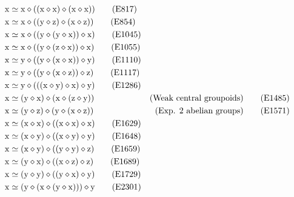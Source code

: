 \begin{align}
    \x &\formaleq \x \op ((\x \op \x) \op (\x \op \x)) \label{eq817}\tag{E817} \\
    \x &\formaleq \x \op ((\y \op \z) \op (\x \op \z)) \label{eq854}\tag{E854}\\
    \x &\formaleq \x \op ((\y \op (\y \op \x)) \op \x) \label{eq1045}\tag{E1045} \\
    \x &\formaleq \x \op ((\y \op (\z \op \x)) \op \x) \label{eq1055}\tag{E1055} \\
    \x &\formaleq \y \op ((\y \op (\x \op \x)) \op \y) \label{eq1110}\tag{E1110} \\
    \x &\formaleq \y \op ((\y \op (\x \op \z)) \op \z) \label{eq1117}\tag{E1117} \\
    \x &\formaleq \y \op (((\x \op \y) \op \x) \op \y) \label{eq1286}\tag{E1286} \\
    \x &\formaleq (\y \op \x) \op (\x \op (\z \op \y)) & \hbox{(Weak central groupoids)}\label{eq1485}\tag{E1485} \\
    \x &\formaleq (\y \op \z) \op (\y \op (\x \op \z)) & \hbox{(Exp. $2$ abelian groups)} \label{eq1571}\tag{E1571} \\
    \x &\formaleq (\x \op \x) \op ((\x \op \x) \op \x) \label{eq1629}\tag{E1629} \\
    \x &\formaleq (\x \op \y) \op ((\x \op \y) \op \y) \label{eq1648}\tag{E1648} \\
    \x &\formaleq (\x \op \y) \op ((\y \op \y) \op \z) \label{eq1659}\tag{E1659} \\
    \x &\formaleq (\y \op \x) \op ((\x \op \z) \op \z) \label{eq1689}\tag{E1689} \\
    \x &\formaleq (\y \op \y) \op ((\y \op \x) \op \y) \label{eq1729}\tag{E1729} \\
    \x &\formaleq (\y \op (\x \op (\y \op \x))) \op \y \label{eq2301}\tag{E2301}
\end{align}
